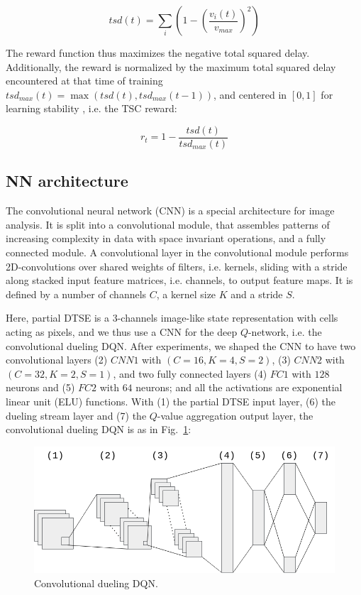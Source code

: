 \documentclass[journal]{IEEEtran}
\begin{document}
\[ tsd(t) = \sum_{i} \left(1 - (\frac{v_i(t)}{v_{max}})^2 \right) \]

The reward function thus maximizes the negative total squared delay. Additionally, the reward is normalized by the maximum total squared delay encountered at that time of training $tsd_{max}(t) = \max (tsd(t), tsd_{max}(t-1))$, and centered in $[0, 1]$ for learning stability \cite{genders2019opensource}, i.e. the TSC reward:

\[ r_t = 1 - \frac{tsd(t)}{tsd_{max}(t)} \]

\subsection{NN architecture}

The convolutional neural network (CNN) \cite{krizhevsky2012imagenet} is a special architecture for image analysis. It is split into a convolutional module, that assembles patterns of increasing complexity in data with space invariant operations, and a fully connected module. A convolutional layer in the convolutional module performs 2D-convolutions over shared weights of filters, i.e. kernels, sliding with a stride along stacked input feature matrices, i.e. channels, to output feature maps. It is defined by a number of channels $C$, a kernel size $K$ and a stride $S$.

Here, partial DTSE is a 3-channels image-like state representation with cells acting as pixels, and we thus use a CNN for the deep $Q$-network, i.e. the convolutional dueling DQN. After experiments, we shaped the CNN to have two convolutional layers (2) $CNN1$ with $(C=16,K=4,S=2)$, (3) $CNN2$ with $(C=32,K=2,S=1)$, and two fully connected layers (4) $FC1$ with $128$ neurons and (5) $FC2$ with $64$ neurons; and all the activations are exponential linear unit (ELU) functions. With (1) the partial DTSE input layer, (6) the dueling stream layer and (7) the $Q$-value aggregation output layer, the convolutional dueling DQN is as in Fig.~\ref{fig:cnn_dueling}:

\begin{figure}[htbp]
  \begin{center}
    \includegraphics[width=1\linewidth,keepaspectratio]{img/model/cnn_dueling.png}  
    \caption{Convolutional dueling DQN.}
    \label{fig:cnn_dueling}
  \end{center}
\end{figure}
\end{document}
